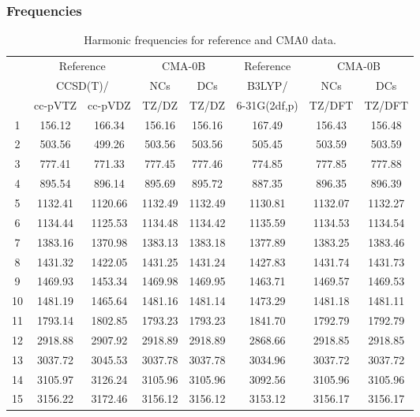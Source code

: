 \documentclass[10pt,oneside]{article}
\begin{document}
\clearpage

\subsubsection*{Frequencies}
\begin{table}[h!]
\centering
\caption{Harmonic frequencies for reference and CMA0 data.}
\begin{tabular}{cccccccc}
\toprule
{} & \multicolumn{2}{c}{Reference} & \multicolumn{2}{c}{CMA-0B} &    Reference & \multicolumn{2}{c}{CMA-0B} \\
{} & \multicolumn{2}{c}{CCSD(T)/} &     NCs &     DCs &       B3LYP/ &     NCs &     DCs \\
{} &   cc-pVTZ & cc-pVDZ &   TZ/DZ &   TZ/DZ & 6-31G(2df,p) &  TZ/DFT &  TZ/DFT \\
\midrule
1  &    156.12 &  166.34 &  156.16 &  156.16 &       167.49 &  156.43 &  156.48 \\
2  &    503.56 &  499.26 &  503.56 &  503.56 &       505.45 &  503.59 &  503.59 \\
3  &    777.41 &  771.33 &  777.45 &  777.46 &       774.85 &  777.85 &  777.88 \\
4  &    895.54 &  896.14 &  895.69 &  895.72 &       887.35 &  896.35 &  896.39 \\
5  &   1132.41 & 1120.66 & 1132.49 & 1132.49 &      1130.81 & 1132.07 & 1132.27 \\
6  &   1134.44 & 1125.53 & 1134.48 & 1134.42 &      1135.59 & 1134.53 & 1134.54 \\
7  &   1383.16 & 1370.98 & 1383.13 & 1383.18 &      1377.89 & 1383.25 & 1383.46 \\
8  &   1431.32 & 1422.05 & 1431.25 & 1431.24 &      1427.83 & 1431.74 & 1431.73 \\
9  &   1469.93 & 1453.34 & 1469.98 & 1469.95 &      1463.71 & 1469.57 & 1469.53 \\
10 &   1481.19 & 1465.64 & 1481.16 & 1481.14 &      1473.29 & 1481.18 & 1481.11 \\
11 &   1793.14 & 1802.85 & 1793.23 & 1793.23 &      1841.70 & 1792.79 & 1792.79 \\
12 &   2918.88 & 2907.92 & 2918.89 & 2918.89 &      2868.66 & 2918.85 & 2918.85 \\
13 &   3037.72 & 3045.53 & 3037.78 & 3037.78 &      3034.96 & 3037.72 & 3037.72 \\
14 &   3105.97 & 3126.24 & 3105.96 & 3105.96 &      3092.56 & 3105.96 & 3105.96 \\
15 &   3156.22 & 3172.46 & 3156.12 & 3156.12 &      3153.12 & 3156.17 & 3156.17 \\
\bottomrule
\end{tabular}
\end{table}
\end{document}
